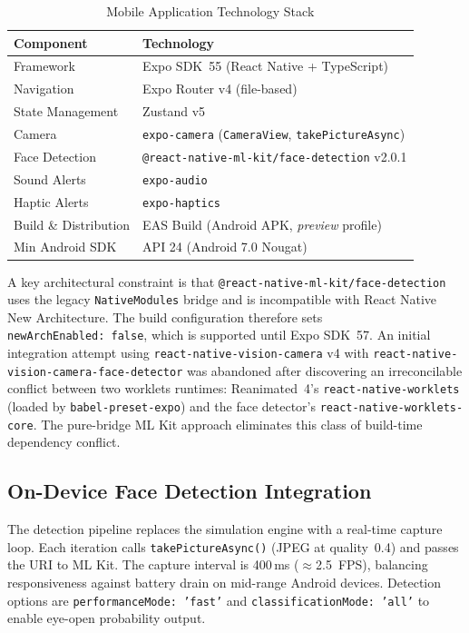 \documentclass[sigconf]{acmart}
\begin{document}
\begin{table}[h]
\centering
\caption{Mobile Application Technology Stack}
\label{tab:mobile_stack}
\small
\begin{tabular}{|p{3cm}|p{4.5cm}|}
\hline
\textbf{Component} & \textbf{Technology} \\
\hline
Framework & Expo SDK~55 (React Native + TypeScript) \\
\hline
Navigation & Expo Router v4 (file-based) \\
\hline
State Management & Zustand v5 \\
\hline
Camera & \texttt{expo-camera} (\texttt{CameraView}, \texttt{takePictureAsync}) \\
\hline
Face Detection & \texttt{@react-native-ml-kit/face-detection} v2.0.1 \\
\hline
Sound Alerts & \texttt{expo-audio} \\
\hline
Haptic Alerts & \texttt{expo-haptics} \\
\hline
Build \& Distribution & EAS Build (Android APK, \textit{preview} profile) \\
\hline
Min Android SDK & API 24 (Android 7.0 Nougat) \\
\hline
\end{tabular}
\end{table}

A key architectural constraint is that \texttt{@react-native-ml-kit/\allowbreak{}face-detection} uses the legacy \texttt{NativeModules} bridge and is incompatible with React Native New Architecture. The build configuration therefore sets \texttt{newArchEnabled:~false}, which is supported until Expo SDK~57. An initial integration attempt using \texttt{react-native-vision-camera} v4 with \texttt{react-native-vision-\allowbreak{}camera-face-detector} was abandoned after discovering an irreconcilable conflict between two worklets runtimes: Reanimated~4's \texttt{react-native-worklets} (loaded by \texttt{babel-preset-expo}) and the face detector's \texttt{react-native-\allowbreak{}worklets-core}. The pure-bridge ML Kit approach eliminates this class of build-time dependency conflict.

\subsection{On-Device Face Detection Integration}

The detection pipeline replaces the simulation engine with a real-time capture loop. Each iteration calls \texttt{takePictureAsync()} (JPEG at quality~0.4) and passes the URI to ML Kit. The capture interval is 400\,ms ($\approx$2.5~FPS), balancing responsiveness against battery drain on mid-range Android devices. Detection options are \texttt{performanceMode: 'fast'} and \texttt{classificationMode: 'all'} to enable eye-open probability output.
\end{document}
